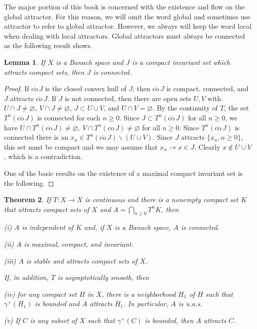 \documentclass{surv-l}
\theoremstyle{plain}
\newtheorem{theorem}{Theorem}[section]
\newtheorem{lemma}[theorem]{Lemma}
\theoremstyle{definition}
\numberwithin{equation}{section}
\numberwithin{figure}{chapter}
\begin{document}
The major portion of this book is concerned with the existence and flow on the global attractor. For this reason, we will omit the word global and sometimes use attractor to refer to global attractor. However, we always will keep the word local when dealing with local attractors. Global attractors must always be connected as the following result shows.
\setcounter{section}{4}
\begin{lemma}\label{lem2.4.1} If $X$ is a Banach space and $J$ is a compact invariant set which attracts compact sets, then $J$ is connected.
\end{lemma}

\begin{proof}
If $\overline{\mathrm{co}}\,J$ is the closed convex hull of $J$, then $\overline{\mathrm{co}}\,J$ is compact, connected, and $J$ attracts $\overline{\mathrm{co}}\,J$. If $J$ is not connected, then there are open sets $U, V$ with $ U\cap J\neq\varnothing,\ V\cap J\neq\varnothing,\ J\subset U\cup V$, and $ U\cap V=\varnothing$. By the continuity of $T$, the set $T^{n}(\overline{\mathrm{co}}\,J)$ is connected for each $n\geq 0$. Since $J\subset T^{n}(\overline{\mathrm{co}}\,J)$ for all $n\geq 0$, we have $ U\cap T^{n}(\overline{\mathrm{co}}\,J)\neq\varnothing,\ V\cap T^{n}(\overline{\mathrm{co}}\,J)\neq\varnothing$ for all $n\geq 0$. Since $T^{n}(\overline{\mathrm{co}}\,J)$ is connected there is an $x_{n}\in T^{n}(\overline{\mathrm{co}}\,J)\backslash (U\cup V)$. Since $J$ attracts $\{x_{n}, n\geq 0\}$, this set must be compact and we may assume that $x_{n}\rightarrow x\in J$. Clearly $x\not\in U\cup V$, which is a contradiction.

One of the basic results on the existence of a maximal compact invariant set is the following.
\end{proof}

\begin{theorem}\label{thm2.4.2} If $T\!:X\rightarrow X$ is continuous and there is a nonempty compact set $K$ that attracts compact sets of $X$ and $A= \bigcap_{n\geq0}T^{n}K$, then

\emph{(i)} $A$ is independent of $K$ and, if $X$ is a Banach space, ${A}$ is connected.

\emph{(ii)} $A$ is maximal, compact, and invariant.

\emph{(iii)} $A$ is stable and attracts compact sets of $X$.

\noindent If, in addition, $T$ is asymptotically smooth, then

\emph{(iv)} for any compact set $H$ in $X$, there is a neighborhood $H_{1}$ of $H$ such that $\gamma^{+}(H_{1})$ is bounded and $A$ attracts $H_{1}$.
 In particular, $A$ is u.a.s.

\emph{(v)} If $C$ is any subset of $X$ such that $\gamma^{+}(C)$ is bounded, then $A$ attracts $C$.
\end{theorem}
\end{document}
